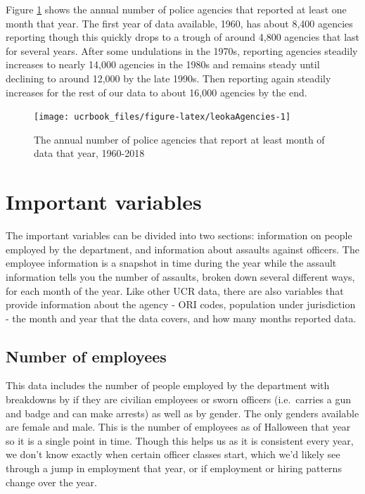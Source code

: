 \documentclass[
  12pt,
  openany]{book}
\begin{document}
Figure \ref{fig:leokaAgencies} shows the annual number of police agencies that reported at least one month that year. The first year of data available, 1960, has about 8,400 agencies reporting though this quickly drops to a trough of around 4,800 agencies that last for several years. After some undulations in the 1970s, reporting agencies steadily increases to nearly 14,000 agencies in the 1980s and remains steady until declining to around 12,000 by the late 1990s. Then reporting again steadily increases for the rest of our data to about 16,000 agencies by the end.

\begin{figure}

{\centering \texttt{[image: ucrbook\_files/figure-latex/leokaAgencies-1]} 

}

\caption{The annual number of police agencies that report at least month of data that year, 1960-2018}\label{fig:leokaAgencies}
\end{figure}

\hypertarget{important-variables-4}{%
\section{Important variables}\label{important-variables-4}}

The important variables can be divided into two sections: information on people employed by the department, and information about assaults against officers. The employee information is a snapshot in time during the year while the assault information tells you the number of assaults, broken down several different ways, for each month of the year. Like other UCR data, there are also variables that provide information about the agency - ORI codes, population under jurisdiction - the month and year that the data covers, and how many months reported data.

\hypertarget{number-of-employees}{%
\subsection{Number of employees}\label{number-of-employees}}

This data includes the number of people employed by the department with breakdowns by if they are civilian employees or sworn officers (i.e.~carries a gun and badge and can make arrests) as well as by gender. The only genders available are female and male. This is the number of employees as of Halloween that year so it is a single point in time. Though this helps us as it is consistent every year, we don't know exactly when certain officer classes start, which we'd likely see through a jump in employment that year, or if employment or hiring patterns change over the year.
\end{document}
